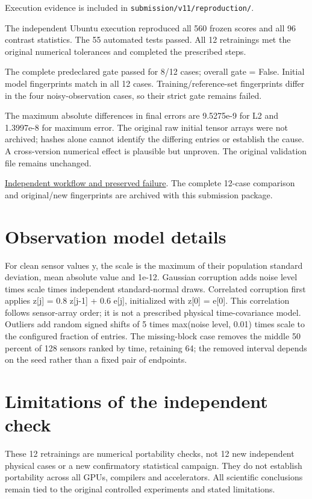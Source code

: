 \documentclass[
  11pt,
]{article}
\begin{document}
Execution evidence is included in \texttt{submission/v11/reproduction/}.

The independent Ubuntu execution reproduced all 560 frozen scores and
all 96 contrast statistics. The 55 automated tests passed. All 12
retrainings met the original numerical tolerances and completed the
prescribed steps.

The complete predeclared gate passed for 8/12 cases; overall gate =
False. Initial model fingerprints match in all 12 cases.
Training/reference-set fingerprints differ in the four noisy-observation
cases, so their strict gate remains failed.

The maximum absolute differences in final errors are 9.5275e-9 for L2
and 1.3997e-8 for maximum error. The original raw initial tensor arrays
were not archived; hashes alone cannot identify the differing entries or
establish the cause. A cross-version numerical effect is plausible but
unproven. The original validation file remains unchanged.

\href{https://github.com/ucef90/Doctorat/actions/runs/34021530276}{Independent
workflow and preserved failure}. The complete 12-case comparison and
original/new fingerprints are archived with this submission package.

\hypertarget{observation-model-details}{%
\section{Observation model details}\label{observation-model-details}}

For clean sensor values y, the scale is the maximum of their population
standard deviation, mean absolute value and 1e-12. Gaussian corruption
adds noise level times scale times independent standard-normal draws.
Correlated corruption first applies z{[}j{]} = 0.8 z{[}j-1{]} + 0.6
e{[}j{]}, initialized with z{[}0{]} = e{[}0{]}. This correlation follows
sensor-array order; it is not a prescribed physical time-covariance
model. Outliers add random signed shifts of 5 times max(noise level,
0.01) times scale to the configured fraction of entries. The
missing-block case removes the middle 50 percent of 128 sensors ranked
by time, retaining 64; the removed interval depends on the seed rather
than a fixed pair of endpoints.

\hypertarget{limitations-of-the-independent-check}{%
\section{Limitations of the independent
check}\label{limitations-of-the-independent-check}}

These 12 retrainings are numerical portability checks, not 12 new
independent physical cases or a new confirmatory statistical campaign.
They do not establish portability across all GPUs, compilers and
accelerators. All scientific conclusions remain tied to the original
controlled experiments and stated limitations.

\endgroup
\end{document}
